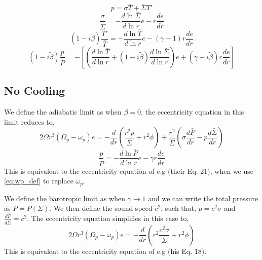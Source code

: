 \documentclass[apj]{emulateapj}
\begin{document}
 \begin{equation}
p = \sigma \bar{T} + \bar{\Sigma} T'
\end{equation}
 \begin{equation}
\frac{\sigma}{\bar{\Sigma}} = - \frac{d \ln \bar{\Sigma}}{ d \ln r} e - r \frac{d e}{d r} 
\end{equation}
\begin{equation}
(1- i\tilde{\beta}) \frac{T'}{\bar{T}} = -\frac{d \ln \bar{T}}{d \ln r} e - (\gamma -1) r \frac{d e}{d r}
\end{equation}
\begin{equation}
(1 - i \tilde{\beta}) \frac{p}{\bar{P}} = - \left[ \left( \frac{d \ln \bar{T}}{d \ln r} + (1- i \tilde{\beta}) \frac{d \ln \bar{\Sigma}}{d \ln r} \right) e + \left(\gamma - i \tilde{\beta} \right) r \frac{de}{dr} \right] 
\end{equation}

\subsection{No Cooling} 

We define the  adiabatic limit as when $\beta=0$, the eccentricity equation in this limit reduces to,
\begin{equation}
2 \Omega r^3 ( \Omega_p - \omega_p) e = - \frac{d}{dr} \left( \frac{r^2 p}{\bar{\Sigma}} + r^2 \phi \right) + \frac{r^2}{\bar{\Sigma}} \left( \sigma \frac{d \bar{P}}{dr} - p \frac{d \bar{\Sigma}}{d r} \right) 
\end{equation}
\begin{equation}
\frac{p}{\bar{P}} = - \frac{ d\ln \bar{P}}{d \ln r } e - \gamma r \frac{ d e}{d r}
\end{equation}
This is equivalent to the eccentricity equation of e.g \citet{go06} (their Eq. 21), when we use \eqref{eq:wp_def} to replace $\omega_p$. 

We define the barotropic limit as when $\gamma \rightarrow 1$ and we can write the total pressure as $P = P(\Sigma)$. We then define the sound speed $c^2$, such that, $p = c^2 \sigma$ and $\frac{d \bar{P}}{d \bar{\Sigma}} = c^2 $. The eccentricity equation simplifies in this case to,
\begin{equation}
2 \Omega r^3 ( \Omega_p - \omega_p) e = - \frac{d}{dr} \left( r^2 \frac{c^2 \sigma}{\bar{\Sigma}} + r^2 \phi \right) 
\end{equation}
This is equivalent to the eccentricity equation of e.g \citet{papa02} (his Eq. 18).
\end{document}
